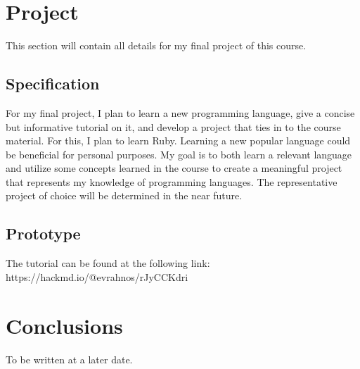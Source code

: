 \documentclass{article}
\theoremstyle{theorem}
\theoremstyle{definition}
\theoremstyle{remark}
\begin{document}
\section{Project}
This section will contain all details for my final project of this course.
\subsection{Specification}
For my final project, I plan to learn a new programming language, give a concise but informative tutorial on it, and develop a project that ties in to the course material. For this, I plan to learn Ruby. Learning a new popular language could be beneficial for personal purposes. My goal is to both learn a relevant language and utilize some concepts learned in the course to create a meaningful project that represents my knowledge of programming languages. The representative project of choice will be determined in the near future.
\subsection{Prototype}
The tutorial can be found at the following link: https://hackmd.io/@evrahnos/rJyCCKdri

\section{Conclusions}\label{conclusions}

To be written at a later date.
\end{document}
